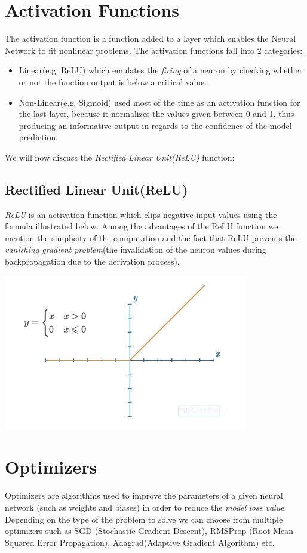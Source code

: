 \section{Activation Functions}
The activation function is a function added to a layer which enables the Neural Network to
fit nonlinear problems.
The activation functions fall into 2 categories:
\begin{itemize}
	\item Linear(e.g. ReLU) which emulates the \textit{firing} of a neuron by checking whether or not the
		function output is below a critical value.
	\item Non-Linear(e.g. Sigmoid) used most of the time as an activation function for the last layer, because it normalizes the values given between 0 and 1, thus producing an informative output in regards to the confidence of the model prediction.
\end{itemize}
We will now discuss the \textit{Rectified Linear Unit(ReLU)} function:
\subsection*{Rectified Linear Unit(ReLU)}
\textit{ReLU} is an activation function which clips negative input values using the formula illustrated below. Among the
advantages of the ReLU function we mention the simplicity of the computation and the fact that ReLU prevents the
\textit{vanishing gradient problem}(the invalidation of the neuron values during backpropagation due to the derivation
process).
\begin{center}
	\includegraphics[width = 4.2in]{images/relu.png}
	\centerline{}
\label{relu}
\end{center}
\section{Optimizers}
Optimizers are algorithms used to improve the parameters of a given neural network (such as weights and biases)
in order to reduce the \textit{model loss value}.
Depending on the type of the problem to solve we can choose from multiple optimizers such as SGD
(Stochastic Gradient Descent), RMSProp (Root Mean Squared Error Propagation), Adagrad(Adaptive Gradient Algorithm) etc.

